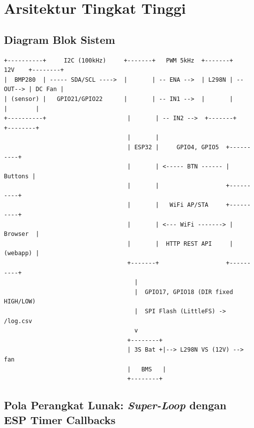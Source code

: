 \documentclass[11pt,a4paper]{article}
\begin{document}
\section{Arsitektur Tingkat Tinggi}

\subsection{Diagram Blok Sistem}

\begin{center}
\begin{verbatim}
+----------+     I2C (100kHz)     +-------+   PWM 5kHz  +-------+   12V    +--------+
|  BMP280  | ----- SDA/SCL ---->  |       | -- ENA -->  | L298N | --OUT--> | DC Fan |
| (sensor) |   GPIO21/GPIO22      |       | -- IN1 -->  |       |          |        |
+----------+                       |       | -- IN2 -->  +-------+          +--------+
                                   |       |
                                   | ESP32 |     GPIO4, GPIO5  +----------+
                                   |       | <----- BTN ------ |  Buttons |
                                   |       |                   +----------+
                                   |       |   WiFi AP/STA     +----------+
                                   |       | <--- WiFi -------> | Browser  |
                                   |       |  HTTP REST API     | (webapp) |
                                   +-------+                   +----------+
                                     |
                                     |  GPIO17, GPIO18 (DIR fixed HIGH/LOW)
                                     |  SPI Flash (LittleFS) -> /log.csv
                                     v
                                   +--------+
                                   | 3S Bat +|--> L298N VS (12V) --> fan
                                   |   BMS   |
                                   +--------+
\end{verbatim}
\end{center}

\subsection{Pola Perangkat Lunak: \emph{Super-Loop} dengan ESP Timer Callbacks}
\end{document}
